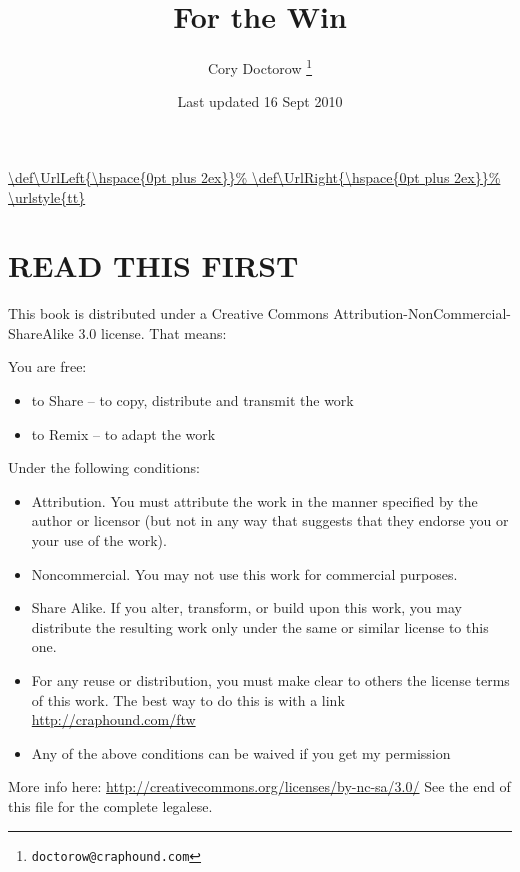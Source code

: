 \usepackage{url}
\DeclareUrlCommand\url{\def\UrlLeft{\hspace{0pt plus 2ex}}%
        \def\UrlRight{\hspace{0pt plus 2ex}}%
        \urlstyle{tt}}




\newcommand{\shopad}[2]{
  \emph{#1}
  \par\smallskip\noindent
  \emph{#2}
  \par\medskip\noindent}

\newcommand\edialog[1]{
{
  \setlength\parindent{0pt}
  \setlength\hangindent{10pt}
  \raggedright
  \textgreater\ \texttt{#1}
  \par
}}



\raggedbottom
\frontmatter

\title{For the Win}
\author{Cory Doctorow
\thanks{\texttt{doctorow@craphound.com}}}
\date{Last updated 16 Sept 2010}

\maketitle

\section{READ THIS FIRST}

This book is distributed under a Creative Commons
Attribution-NonCommercial-ShareAlike 3.0 license. That means:

You are free:

\begin{itemize}
\item 
  to Share -- to copy, distribute and transmit the work
\item 
  to Remix -- to adapt the work
\end{itemize}
Under the following conditions:
\begin{itemize}
\item 
  Attribution. You must attribute the work in the manner specified by
  the author or licensor (but not in any way that suggests that they
  endorse you or your use of the work).
\item 
  Noncommercial. You may not use this work for commercial purposes.
\item 
  Share Alike. If you alter, transform, or build upon this work, you
  may distribute the resulting work only under the same or similar
  license to this one.
\item 
  For any reuse or distribution, you must make clear to others the
  license terms of this work. The best way to do this is with a link
  \url{http://craphound.com/ftw}
\item 
  Any of the above conditions can be waived if you get my permission
\end{itemize}
More info here:
\url{http://creativecommons.org/licenses/by-nc-sa/3.0/}
See the end of this file for the complete legalese.

